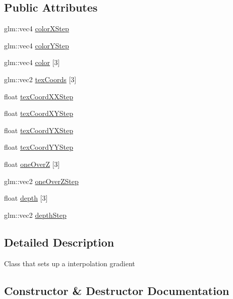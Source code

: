 \subsection*{Public Attributes}
\begin{DoxyCompactItemize}
\item 
glm\+::vec4 \hyperlink{class_gradient_a0451719335035c075a67204cdb80252f}{color\+X\+Step}
\item 
glm\+::vec4 \hyperlink{class_gradient_a3ac810ca548605633dd2497d9376e583}{color\+Y\+Step}
\item 
glm\+::vec4 \hyperlink{class_gradient_a71c3ddc8c7826a17338723232d9bc7ea}{color} \mbox{[}3\mbox{]}
\item 
glm\+::vec2 \hyperlink{class_gradient_ae71837d2a5b35d006054d5d474eddb1a}{tex\+Coords} \mbox{[}3\mbox{]}
\item 
float \hyperlink{class_gradient_a624a5bc1117ef0ff5586505bd7414b00}{tex\+Coord\+X\+X\+Step}
\item 
float \hyperlink{class_gradient_a8afadd4049d8b9eb22cbc400e70560aa}{tex\+Coord\+X\+Y\+Step}
\item 
float \hyperlink{class_gradient_a81d975aa437d9aa2d4f4902073c1f529}{tex\+Coord\+Y\+X\+Step}
\item 
float \hyperlink{class_gradient_a7d935258d173da77270987a4c95f3462}{tex\+Coord\+Y\+Y\+Step}
\item 
float \hyperlink{class_gradient_aab07e150dbcc6550c252b66180ceceb2}{one\+Over\+Z} \mbox{[}3\mbox{]}
\item 
glm\+::vec2 \hyperlink{class_gradient_aa3bc11489f5f615cafc9dc8c8c180145}{one\+Over\+Z\+Step}
\item 
float \hyperlink{class_gradient_ac0077f281e1539333e984574e8f728a3}{depth} \mbox{[}3\mbox{]}
\item 
glm\+::vec2 \hyperlink{class_gradient_a45a2e551be6a31ce12fdc3c39191914f}{depth\+Step}
\end{DoxyCompactItemize}


\subsection{Detailed Description}
Class that sets up a interpolation gradient 

\subsection{Constructor \& Destructor Documentation}
\hypertarget{class_gradient_a4fd340dfd44bc432746d239cb809a0ee}{}
